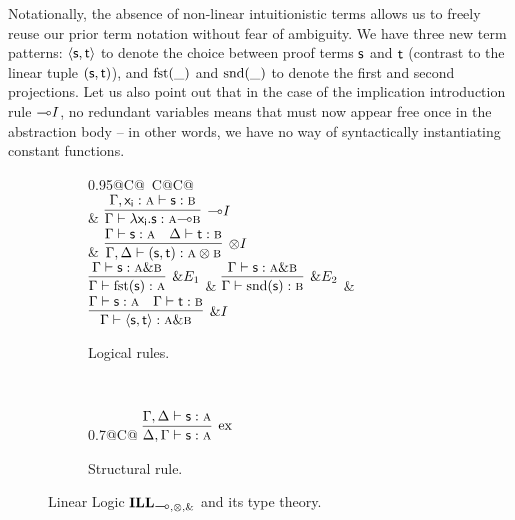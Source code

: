 Notationally, the absence of non-linear intuitionistic terms allows us to freely reuse our prior term notation without fear of ambiguity.
We have three new term patterns: $\langle \mathsf{s}, \mathsf{t} \rangle$ to denote the choice between proof terms $\mathsf{s}$ and $\mathsf{t}$ (contrast to the linear tuple $(\mathsf{s}, \mathsf{t})$), and $\textrm{fst}(\_)$ and $\textrm{snd}(\_)$ to denote the first and second projections.
Let us also point out that in the case of the implication introduction rule $\li I$, no redundant variables means that  must now appear free once in the abstraction body  -- in other words, we have no way of syntactically instantiating constant functions.

\begin{figure}
	\centering
	\begin{subfigure}{1\textwidth}
		\centering
		\begin{tabularx}{0.95\textwidth}{@{}C@{~}C@{\qquad}C@{}}
		\\[2em]
		& 
		$\infer[\li I]{\Gamma \vdash \term{\lambda x_i.s}: \prop A \li \prop B}{\Gamma, \term{x_i}: \prop A \vdash \term{s}: \prop B}$\\[\smallsep]
		&
		$\infer[\otimes I]{\Gamma, \Delta \vdash (\term{s}, \term{t}): \prop A \otimes \prop B}{\Gamma \vdash \term{s}: \prop A & \Delta \vdash \term{t}: \prop B}$\\[\smallsep]
		$
		\infer[\with E_1]{\Gamma \vdash \cterm{fst(\smallterm{s})}: \prop{A}}{\Gamma \vdash \smallterm{s}: \prop{A} \with \prop{B}}
		$
		&
		$
		\infer[\with E_2]{\Gamma \vdash \cterm{snd(\smallterm{s})}: \prop{B}}{\Gamma \vdash \term{s}: \prop{A} \with \prop{B}}
		$
		&
		$
		\infer[\with I]{\Gamma \vdash \langle\term{s}, \term{t}\rangle: \prop{A} \with \prop{B}}{\Gamma \vdash \term{s}: \prop{A} & \Gamma \vdash \term{t}: \prop{B}}
		$
		\end{tabularx}
		\caption{Logical rules.}
		\label{subfigure:linear_logic_rules:logical}
	\end{subfigure}\\[\midsep]
	\begin{subfigure}{1\textwidth}
		\centering
		\begin{tabularx}{0.7\textwidth}{@{}C@{}}
		$
		\infer[\Exchange{}]{\Delta, \Gamma \vdash \term{s}: \prop{A}}{\Gamma, \Delta \vdash \term{s}:  \prop{A}}
		$
		\end{tabularx}
		\caption{Structural rule.}
		\label{subfigure:linear_logic_rules:structural}
	\end{subfigure}
	\caption{Linear Logic $\ILL_{\li,\otimes,\with}$ and its type theory.}
	\label{figure:linear_logic_rules}
\end{figure}

